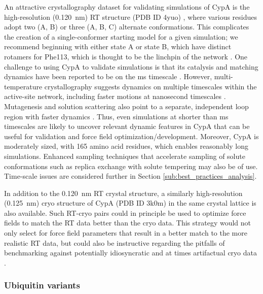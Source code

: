 \documentclass[9pt,review]{livecoms}
\begin{document}
An attractive crystallography dataset for validating simulations of CypA is the high-resolution (\qty{0.120}{\nano\meter}) RT structure (PDB ID 4yuo) \cite{keedy_mapping_2015}, where various residues adopt two (A, B) or three (A, B, C) alternate conformations.
This complicates the creation of a single-conformer starting model for a given simulation; we recommend beginning with either state A or state B, which have distinct rotamers for Phe113, which is thought to be the linchpin of the network \cite{keedy_mapping_2015}.
One challenge to using CypA to validate simulations is that its catalysis and matching dynamics have been reported to be on the ms timescale \cite{eisenmesser_intrinsic_2005}.
However, multi-temperature crystallography suggests dynamics on multiple timescales within the active-site network, including faster motions at nanosecond timescales \cite{keedy_mapping_2015}.
Mutagenesis and solution scattering also point to a separate, independent loop region with faster dynamics \cite{thompson_temperature-jump_2019}.
Thus, even simulations at shorter than ms timescales are likely to uncover relevant dynamic features in CypA that can be useful for validation and force field optimization/development.
Moreover, CypA is moderately sized, with 165 amino acid residues, which enables reasonably long simulations.
Enhanced sampling techniques \cite{henin_enhanced_2022} that accelerate sampling of solute conformations such as replica exchange with solute tempering \cite{wang_replica_2011} may also be of use.
Time-scale issues are considered further in Section \ref{sub:best_practices_analysis}.

In addition to the \qty{0.120}{\nano\meter} RT crystal structure, a similarly high-resolution (\qty{0.125}{\nano\meter}) cryo structure of CypA (PDB ID 3k0m) \cite{fraser_hidden_2009} in the same crystal lattice is also available.
Such RT-cryo pairs could in principle be used to optimize force fields to match the RT data better than the cryo data.
This strategy would not only select for force field parameters that result in a better match to the more realistic RT data, but could also be instructive regarding the pitfalls of benchmarking against potentially idiosyncratic \cite{keedy_crystal_2014} and at times artifactual cryo data \cite{cbradford_temperature_2021}.

\subsubsection{Ubiquitin variants}
\label{sub2:ubiquitin}
\end{document}
